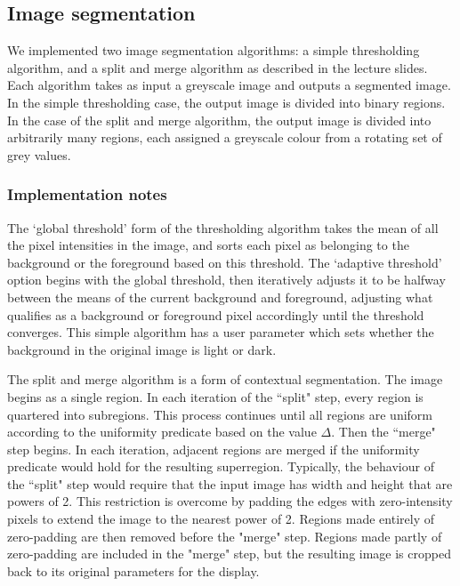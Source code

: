 \subsection{Image segmentation}
\label{sec:segmentation}

We implemented two image segmentation algorithms: a simple thresholding algorithm, and a split and merge algorithm as described in the lecture slides. Each algorithm takes as input a greyscale image and outputs a segmented image. In the simple thresholding case, the output image is divided into binary regions. In the case of the split and merge algorithm, the output image is divided into arbitrarily many regions, each assigned a greyscale colour from a rotating set of grey values.

\subsubsection{Implementation notes}

The `global threshold' form of the thresholding algorithm takes the mean of all the pixel intensities in the image, and sorts each pixel as belonging to the background or the foreground based on this threshold. The `adaptive threshold' option begins with the global threshold, then iteratively adjusts it to be halfway between the means of the current background and foreground, adjusting what qualifies as a background or foreground pixel accordingly until the threshold converges. This simple algorithm has a user parameter which sets whether the background in the original image is light or dark.

The split and merge algorithm is a form of contextual segmentation. The image begins as a single region. In each iteration of the ``split" step, every region is quartered into subregions. This process continues until all regions are uniform according to the uniformity predicate based on the value $\Delta$. Then the ``merge" step begins. In each iteration, adjacent regions are merged if the uniformity predicate would hold for the resulting superregion. Typically, the behaviour of the ``split" step would require that the input image has width and height that are powers of 2. This restriction is overcome by padding the edges with zero-intensity pixels to extend the image to the nearest power of 2. Regions made entirely of zero-padding are then removed before the "merge" step. Regions made partly of zero-padding are included in the "merge" step, but the resulting image is cropped back to its original parameters for the display.

